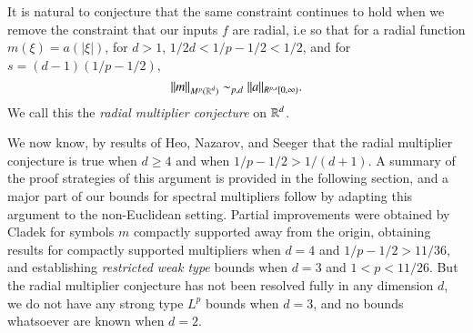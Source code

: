 
It is natural to conjecture that the same constraint continues to hold when we remove the constraint that our inputs $f$ are radial, i.e so that for a radial function $m(\xi) = a(|\xi|)$, for $d > 1$, $1/2d < 1/p - 1/2 < 1/2$, and for $s = (d-1)(1/p - 1/2)$,
%
\begin{equation} \label{RadialMultiplierBound}
  \| m \|_{M^p(\operatorname{\mathbb{R}}^d)} \sim_{p,d} \| a \|_{R^{p,s}[0,\infty)}.
\end{equation}
%
%
%
We call this the \emph{radial multiplier conjecture} on $\operatorname{\mathbb{R}}^d$.

We now know, by results of Heo, Nazarov, and Seeger \cite{HeoandNazarovandSeeger} that the radial multiplier conjecture is true when $d \geq 4$ and when $1/p - 1/2 > 1/(d+1)$. A summary of the proof strategies of this argument is provided in the following section, and a major part of our bounds for spectral multipliers follow by adapting this argument to the non-Euclidean setting. Partial improvements were obtained by Cladek \cite{Cladek} for symbols $m$ compactly supported away from the origin, obtaining results for compactly supported multipliers when $d = 4$ and $1/p - 1/2 > 11/36$, and establishing \emph{restricted weak type} bounds when $d = 3$ and $1 < p < 11/26$. %
But the radial multiplier conjecture has not been resolved fully in any dimension $d$, we do not have any strong type $L^p$ bounds when $d = 3$, and no bounds whatsoever are known when $d = 2$.

